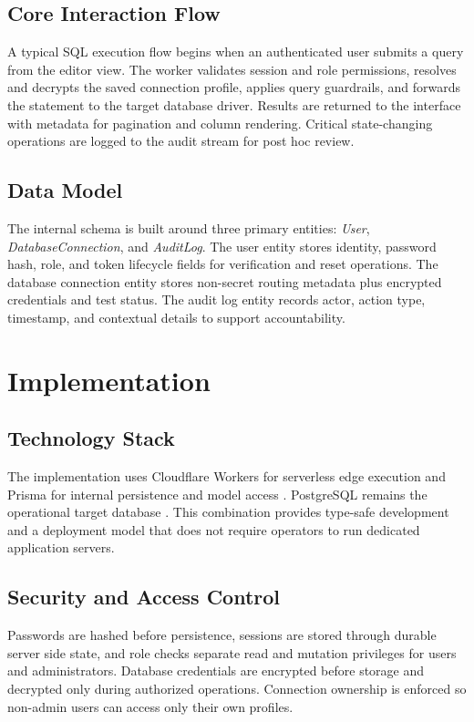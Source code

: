 \documentclass[conference]{IEEEtran}
\begin{document}
\subsection{Core Interaction Flow}

A typical SQL execution flow begins when an authenticated user submits a query from the editor view. The worker validates session and role permissions, resolves and decrypts the saved connection profile, applies query guardrails, and forwards the statement to the target database driver. Results are returned to the interface with metadata for pagination and column rendering. Critical state-changing operations are logged to the audit stream for post hoc review.

\subsection{Data Model}

The internal schema is built around three primary entities: \textit{User}, \textit{DatabaseConnection}, and \textit{AuditLog}. The user entity stores identity, password hash, role, and token lifecycle fields for verification and reset operations. The database connection entity stores non-secret routing metadata plus encrypted credentials and test status. The audit log entity records actor, action type, timestamp, and contextual details to support accountability.

\section{Implementation}

\subsection{Technology Stack}

The implementation uses Cloudflare Workers for serverless edge execution and Prisma for internal persistence and model access \cite{cloudflare-workers,prisma-orm}. PostgreSQL remains the operational target database \cite{postgresql}. This combination provides type-safe development and a deployment model that does not require operators to run dedicated application servers.

\subsection{Security and Access Control}

Passwords are hashed before persistence, sessions are stored through durable server side state, and role checks separate read and mutation privileges for users and administrators. Database credentials are encrypted before storage and decrypted only during authorized operations. Connection ownership is enforced so non-admin users can access only their own profiles.
\end{document}
